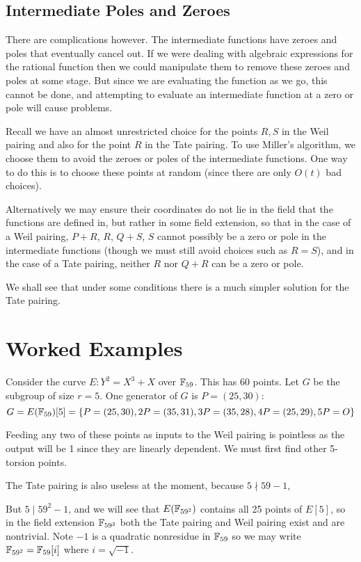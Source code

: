 \subsection {Intermediate Poles and Zeroes}

There are complications however. The intermediate functions have zeroes
and poles that eventually cancel out. If we were dealing with algebraic
expressions for the rational function then we could manipulate
them to remove these zeroes and poles at some stage.
But since we are evaluating the function as we go,
this cannot be done, and attempting to evaluate an
intermediate function at a zero
or pole will cause problems.

Recall we have an almost unrestricted choice for the points $R, S$ in
the Weil pairing and also for the point $R$
in the Tate pairing. To use Miller's algorithm, we choose them
to avoid the zeroes or poles
of the intermediate functions. One way to do this is to choose
these points at random (since there are only $O(t)$ bad choices).

Alternatively we may ensure their coordinates do not lie in the
field that the functions are defined in, but rather in some field
extension, so that in the case of a Weil pairing, $P+R$, $R$, $Q+S$, $S$
cannot possibly be a zero or pole in the intermediate functions
(though we must still avoid choices such as $R = S$),
and in the case of a Tate pairing, neither $R$ nor $Q + R$
can be a zero or pole.

We shall see that under some conditions there is a much simpler solution
for the Tate pairing.

\section {Worked Examples}

Consider the curve $E : Y^2 = X^3 + X$ over $\mathbb{F}_{59}$.
This has 60 points. Let $G$ be the subgroup of size $r = 5$.
One generator of $G$ is $P = (25, 30)$:
\[ G =
E(\mathbb{F}_{59})[5] =
\{P = (25, 30), 2P = (35, 31), 3P = (35, 28), 4P = (25, 29), 5P = O \} \]

Feeding any two of these points as inputs to the Weil pairing is pointless
as the output will be 1 since they are linearly dependent. We must first
find other 5-torsion points.

The Tate pairing is also useless at the moment, because $5 \nmid 59 - 1$,

But $5 \mid 59^2 - 1$, and we will see that $E(\mathbb{F}_{59^2})$ contains
all 25 points of $E[5]$, so in the field extension $\mathbb{F}_{59^2}$
both the Tate pairing
and Weil pairing exist and are nontrivial.
Note $-1$ is a quadratic nonresidue in $\mathbb{F}_{59}$
so we may write $\mathbb{F}_{59^2} = \mathbb{F}_{59}[i]$ where $i = \sqrt{-1}$.

